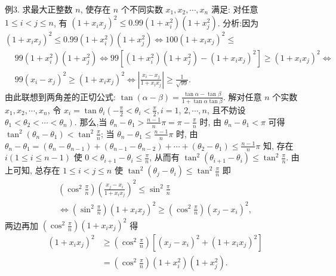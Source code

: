 例3. 求最大正整数 $n$, 使存在 $n$ 个不同实数 $x_1, x_2, \cdots, x_n$ 满足: 对任意 $1 \leqslant i<j \leqslant n$, 有 $\left(1+x_i x_j\right)^2 \leqslant 0.99\left(1+x_i^2\right)\left(1+x_j^2\right)$.
分析:因为 $\left(1+x_i x_j\right)^2 \leqslant 0.99\left(1+x_i^2\right)\left(1+x_j^2\right) \Leftrightarrow 100\left(1+x_i x_j\right)^2 \leqslant$
$$
\begin{aligned}
& 99\left(1+x_i^2\right)\left(1+x_j^2\right) \Leftrightarrow 99\left[\left(1+x_i^2\right)\left(1+x_j^2\right)-\left(1+x_i x_j\right)^2\right] \geqslant\left(1+x_i x_j\right)^2 \Leftrightarrow \\
& 99\left(x_i-x_j\right)^2 \geqslant\left(1+x_i x_j\right)^2 \Leftrightarrow\left|\frac{x_i-x_j}{1+x_i x_j}\right| \geqslant \frac{1}{\sqrt{99}} .
\end{aligned}
$$
由此联想到两角差的正切公式: $\tan (\alpha-\beta)=\frac{\tan \alpha-\tan \beta}{1+\tan \alpha \tan \beta}$.
解对任意 $n$ 个实数 $x_1, x_2, \cdots, x_n$, 令 $x_i=\tan \theta_i\left(-\frac{\pi}{2}<\theta_i<\frac{\pi}{2}, i=1\right.$, $2, \cdots, n$, 且不妨设 $\left.\theta_1<\theta_2<\cdots<\theta_n\right)$.
那么,当 $\theta_n-\theta_1>\frac{n-1}{n} \pi=\pi-\frac{\pi}{n}$ 时, 由 $\theta_n-\theta_1<\pi$ 可得 $\tan ^2\left(\theta_n-\theta_1\right)< \tan ^2 \frac{\pi}{n}$; 当 $\theta_n-\theta_1 \leqslant \frac{n-1}{n} \pi$ 时, 由 $\theta_n-\theta_1=\left(\theta_n-\theta_{n-1}\right)+\left(\theta_{n-1}-\theta_{n-2}\right)+\cdots+\left(\theta_2-\right. \left.\theta_1\right) \leqslant \frac{n-1}{n} \pi$ 知, 存在 $i(1 \leqslant i \leqslant n-1)$ 使 $0<\theta_{i+1}-\theta_i \leqslant \frac{\pi}{n}$, 从而有 $\tan ^2\left(\theta_{i+1}-\theta_i\right) \leqslant \tan ^2 \frac{\pi}{n}$. 由上可知, 总存在 $1 \leqslant i<j \leqslant n$ 使 $\tan ^2\left(\theta_j-\theta_i\right) \leqslant \tan ^2 \frac{\pi}{n}$ 即
$$
\begin{gathered}
\left(\cos ^2 \frac{\pi}{n}\right)\left(\frac{x_j-x_i}{1+x_i x_j}\right)^2 \leqslant \sin ^2 \frac{\pi}{n} \\
\Leftrightarrow\left(\sin ^2 \frac{\pi}{n}\right)\left(1+x_i x_j\right)^2 \geqslant\left(\cos ^2 \frac{\pi}{n}\right)\left(x_j-x_i\right)^2,
\end{gathered}
$$
两边再加 $\left(\cos ^2 \frac{\pi}{n}\right)\left(1+x_i x_j\right)^2$ 得
$$
\begin{aligned}
\left(1+x_i x_j\right)^2 & \geqslant\left(\cos ^2 \frac{\pi}{n}\right)\left[\left(x_j-x_i\right)^2+\left(1+x_i x_j\right)^2\right] \\
& =\left(\cos ^2 \frac{\pi}{n}\right)\left(1+x_i^2\right)\left(1+x_j^2\right) .
\end{aligned}
$$

